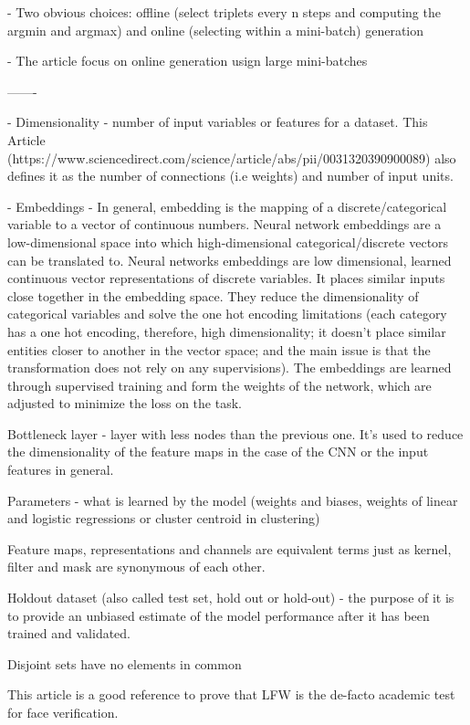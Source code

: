 \documentclass[class=report, crop=false, a4paper, 12pt]{standalone}
\begin{document}
- Two obvious choices: offline (select triplets every n steps and computing the argmin and argmax)  and online (selecting within a mini-batch) generation

- The article focus on online generation usign large mini-batches

-------


- Dimensionality - number of input variables or features for a dataset. This Article (https://www.sciencedirect.com/science/article/abs/pii/0031320390900089) also defines it as the number of connections (i.e weights) and number of input units.

- Embeddings - In general, embedding is the mapping of a discrete/categorical variable to a vector of continuous numbers. Neural network embeddings are a low-dimensional space into which high-dimensional categorical/discrete vectors can be translated to. Neural networks embeddings are low dimensional, learned continuous vector representations of discrete variables. It places similar inputs close together in the embedding space. They reduce the dimensionality of categorical variables and solve the one hot encoding limitations (each category has a one hot encoding, therefore, high dimensionality; it doesn't place similar entities closer to another in the vector space; and the main issue is that the transformation does not rely on any supervisions). The embeddings are learned through supervised training and form the weights of the network, which are adjusted to minimize the loss on the task.

Bottleneck layer - layer with less nodes than the previous one. It's used to reduce the dimensionality of the feature maps in the case of the CNN or the input features in general.

Parameters - what is learned by the model (weights and biases, weights of linear and logistic regressions or cluster centroid in clustering)

Feature maps, representations and channels are equivalent terms just as kernel, filter and mask are synonymous of each other.

Holdout dataset (also called test set, hold out or hold-out) - the purpose of it is to provide an unbiased estimate of the model performance  after it has been trained and validated.

Disjoint sets have no elements in common

This article is a good reference to prove that LFW is the de-facto academic test for face verification.
\end{document}
